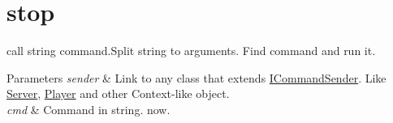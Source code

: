 \hypertarget{stop-example}{\section{stop}
}
call string command.\-Split string to arguments. Find command and run it.


\begin{DoxyParams}{Parameters}
{\em sender} & Link to any class that extends \hyperlink{class_i_command_sender}{I\-Command\-Sender}. Like \hyperlink{class_server}{Server}, \hyperlink{struct_player}{Player} and other Context-\/like object. \\
\hline
{\em cmd} & Command in string. now.\\
\hline
\end{DoxyParams}

\begin{DoxyCodeInclude}
\end{DoxyCodeInclude}
 